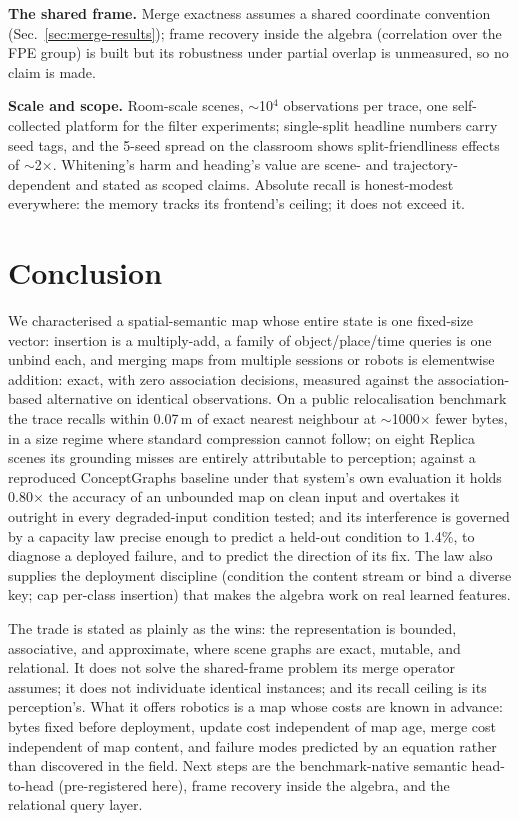 \documentclass[conference]{IEEEtran}
\begin{document}
\textbf{The shared frame.} Merge exactness assumes a shared coordinate
convention (Sec.~\ref{sec:merge-results}); frame recovery inside the
algebra (correlation over the FPE group) is built but its robustness
under partial overlap is unmeasured, so no claim is made.

\textbf{Scale and scope.} Room-scale scenes, $\sim$10$^4$ observations per
trace, one self-collected platform for the filter experiments;
single-split headline numbers carry seed tags, and the 5-seed spread on
the classroom shows split-friendliness effects of $\sim$2$\times$.
Whitening's harm and heading's value are scene- and
trajectory-dependent and stated as scoped claims. Absolute recall is
honest-modest everywhere: the memory tracks its frontend's ceiling; it
does not exceed it.

\section{Conclusion}
\label{sec:conclusion}

We characterised a spatial-semantic map whose entire state is one
fixed-size vector: insertion is a multiply-add, a family of
object/place/time queries is one unbind each, and merging maps from
multiple sessions or robots is elementwise addition: exact, with zero
association decisions, measured against the association-based alternative
on identical observations. On a public relocalisation benchmark the trace
recalls within 0.07\,m of exact nearest neighbour at $\sim$1000$\times$
fewer bytes, in a size regime where standard compression cannot follow;
on eight Replica scenes its grounding misses are entirely attributable to
perception; against a reproduced ConceptGraphs baseline under that
system's own evaluation it holds 0.80$\times$ the accuracy of an
unbounded map on clean input and overtakes it outright in every
degraded-input condition tested; and its interference is governed by a
capacity law precise enough to predict a held-out condition to 1.4\%,
to diagnose a deployed failure, and to predict the direction of its
fix. The law also supplies the
deployment discipline (condition the content stream or bind a diverse
key; cap per-class insertion) that makes the algebra work on real
learned features.

The trade is stated as plainly as the wins: the representation is
bounded, associative, and approximate, where scene graphs are exact,
mutable, and relational. It does not solve the shared-frame problem its
merge operator assumes; it does not individuate identical instances; and
its recall ceiling is its perception's. What it offers robotics is a
map whose costs are known in advance: bytes fixed before deployment,
update cost independent of map age, merge cost independent of map
content, and failure modes predicted by an equation rather than
discovered in the field. Next steps are the benchmark-native semantic
head-to-head (pre-registered here), frame recovery inside the algebra,
and the relational query layer.
\end{document}
